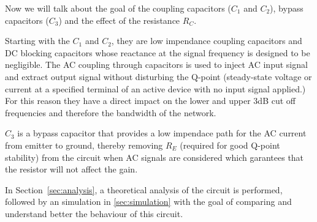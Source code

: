 Now we will talk about the goal of the coupling capacitors ($C_{1}$ and $C_{2}$), bypass capacitors ($C_{3}$) and the effect of the resistance $R_{C}$.


Starting with the $C_{1}$ and $C_{2}$, they are low impendance coupling capacitors and DC blocking capacitors whose reactance at the signal frequency is designed to be negligible.
The AC coupling through capacitors is used to inject AC input signal and extract output signal without disturbing the Q-point (steady-state voltage or current at a specified terminal of an active device with no input signal applied.)
For this reason they have a direct impact on the lower and upper 3dB cut off frequencies and therefore the bandwidth of the network.

$C_{3}$ is a bypass capacitor that provides a low impendace path for the AC current from emitter to ground,
thereby removing $R_{E}$ (required for good Q-point stability) from the circuit when AC signals are considered which garantees that the resistor will not affect the gain.

In Section~\ref{sec:analysis}, a theoretical analysis of the circuit is performed, followed by an simulation in \ref{sec:simulation}
with the goal of comparing and understand better the behaviour of this circuit.







